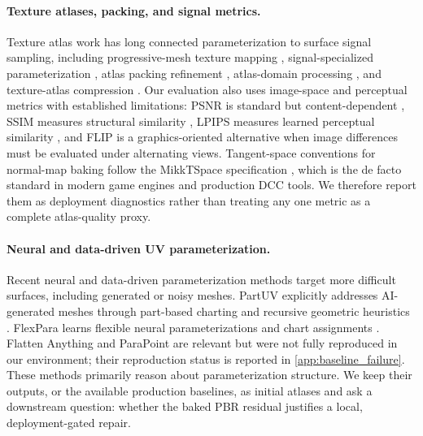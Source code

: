 \paragraph*{Texture atlases, packing, and signal metrics.}
Texture atlas work has long connected parameterization to surface signal sampling, including progressive-mesh texture mapping \cite{sander2001_texture_mapping_progressive_meshes}, signal-specialized parameterization \cite{sander2002_signal_specialized_parameterization}, atlas packing refinement \cite{limper2018_box_cutter_atlas_refinement}, atlas-domain processing \cite{prada2018_gradient_domain_texture_atlas}, and texture-atlas compression \cite{luo2023_texture_atlas_compression}. Our evaluation also uses image-space and perceptual metrics with established limitations: PSNR is standard but content-dependent \cite{huynh2008_psnr_validity}, SSIM measures structural similarity \cite{wang2004_ssim}, LPIPS measures learned perceptual similarity \cite{zhang2018_lpips}, and FLIP \cite{andersson2020_flip} is a graphics-oriented alternative when image differences must be evaluated under alternating views. Tangent-space conventions for normal-map baking follow the MikkTSpace specification \cite{mikkelsen2008_mikktspace}, which is the de facto standard in modern game engines and production DCC tools. We therefore report them as deployment diagnostics rather than treating any one metric as a complete atlas-quality proxy.

\paragraph*{Neural and data-driven UV parameterization.}
Recent neural and data-driven parameterization methods target more difficult surfaces, including generated or noisy meshes. PartUV explicitly addresses AI-generated meshes through part-based charting and recursive geometric heuristics \cite{wang2025_partuv_part_based_uv}. FlexPara learns flexible neural parameterizations and chart assignments \cite{zhao2025_flexpara_flexible_neural_surface}. Flatten Anything and ParaPoint are relevant but were not fully reproduced in our environment; their reproduction status is reported in \cref{app:baseline_failure}. These methods primarily reason about parameterization structure. We keep their outputs, or the available production baselines, as initial atlases and ask a downstream question: whether the baked PBR residual justifies a local, deployment-gated repair.

